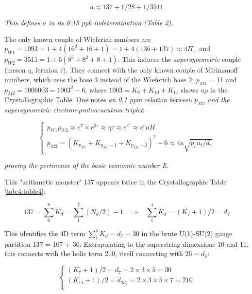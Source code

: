 \documentclass[a4paper,9pt]{article}
\newcounter{row}
\begin{document}
\begin{equation}
a \approx 137 + 1/28 + 1/3511
\end{equation}

\textit {This defines $a$ in its 0.15 ppb indetermination (Table 2)}. 

The only known couple of Wieferich numbers are $p_{W1} = 1093 = 1+ 4(16^2 + 16 + 1) = 1 + 4(136+137) \approx 4 \Pi_+ $ and $p_{W2} = 3511 = 1+ 6(8^3 + 8^2 + 8 +1)$. This induces the \textit {supersymmetric} couple (meson $\eta$, fermion $\tau$). They connect with the only known couple of Mirimanoff numbers, which uses the base 3 instead of the Wieferich base 2: $p_{M1}$ = 11 and $p_{M2} = 1006003 = 1003^2 - 6$, where $1003 = K_9 + K_{10} + K_{11}$ shows up in the Crystallographic Table. One notes  \textit {an 0.1 ppm relation between $p_{M2}$ and the supersymmetric electron-proton-neutron triplet}:


\begin{equation}
 \left\{
    \begin{array}{ll}
    p_{W1} p_{W2} \approx e^7 \times e^{3e} \approx \eta \tau \approx  e^{e^e} \approx  e^e aH\\
    
         p_{M2} = (K_{p_{M1}} + K_{p_{M1}-1} + K_{p_{M1}-2})^2 - 6 \approx 4a \sqrt {p_rn_t/d_e}      

    \end{array}
\right.
\end{equation}

\textit{proving the pertinence of the basic economic number E}.



This "arithmetic monster" 137 appears twice in the Crystallographic Table \ref{tab:4:table4}:

\begin{equation}
137 = \sum_6^8 K_d = \sum_1^7(N_d/2) -1   ~~~~ \Rightarrow~~~~ \sum_1^4K_d = (K_7+1)/2 = d_7  
 \end{equation}
 
This identifies the 4D term $\sum_1^4K_d =  d_7 = 30$ in the brute U(1)-SU(2) gauge partition 137 = 107 + 30\cite{Taylor}. Extrapolating to the superstring dimensions 10 and 11, this connects with the holic term 210, itself connecting with $26 = d_6$:
 
 \begin{equation}
 \left\{
    \begin{array}{ll}
          (K_7+1)/2 = d_7 = 2\times3\times5 = 30\\
          (K_{11}+1)/2 = d_{2d_6} = 2\times3\times5\times7 = 210 \\
    \end{array}
\right.
\end{equation}
\end{document}
